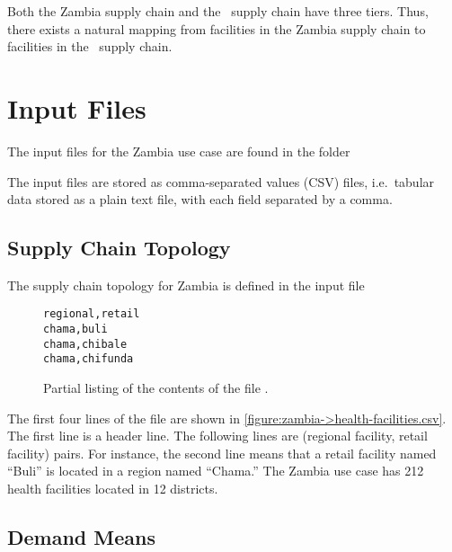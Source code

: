 Both the Zambia supply chain and the \scs\ supply chain have three tiers.
Thus, there exists a natural mapping
from facilities in the Zambia supply chain
to facilities in the \scs\ supply chain.



\section{Input Files}

The input files for the Zambia use case are found in the folder
\begin{quote}
\end{quote}
The input files are stored as comma-separated values (CSV) files,
i.e.\ tabular data stored as a plain text file,
with each field separated by a comma.




\subsection{Supply Chain Topology}

The supply chain topology for Zambia
is defined in the input file
\begin{quote}
\end{quote}
\begin{figure}[h!]
\begin{lstlisting}
regional,retail
chama,buli
chama,chibale
chama,chifunda
\end{lstlisting}
\caption{Partial listing of the contents of
the file \protect{}.}
\label{figure:zambia->health-facilities.csv}
\end{figure}


The first four lines of the file are shown
in \autoref{figure:zambia->health-facilities.csv}.
The first line is a header line.
The following lines are (regional facility, retail facility) pairs.
For instance, the second line means that a retail facility named ``Buli''
is located in a region named ``Chama.''
The Zambia use case has 212 health facilities
located in 12 districts.









\subsection{Demand Means}

